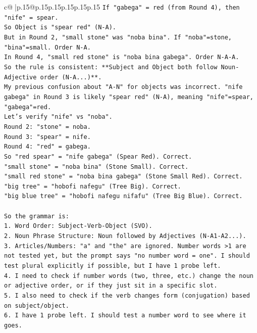 \documentclass{article}
\begin{document}
{\begin{supertabular}{c@{$\;$}|p{.15\linewidth}@{}p{.15\linewidth}p{.15\linewidth}p{.15\linewidth}p{.15\linewidth}p{.15\linewidth}}
{{{\texttt{If "gabega" = red (from Round 4), then "nife" = spear.} \\
\texttt{So Object is "spear red" (N{-}A).} \\
\texttt{But in Round 2, "small stone" was "noba bina". If "noba"=stone, "bina"=small. Order N{-}A.} \\
\texttt{In Round 4, "small red stone" is "noba bina gabega". Order N{-}A{-}A.} \\
\texttt{So the rule is consistent: **Subject and Object both follow Noun{-}Adjective order (N{-}A...)**.} \\
\texttt{My previous confusion about "A{-}N" for objects was incorrect. "nife gabega" in Round 3 is likely "spear red" (N{-}A), meaning "nife"=spear, "gabega"=red.} \\
\texttt{Let's verify "nife" vs "noba".} \\
\texttt{Round 2: "stone" = noba.} \\
\texttt{Round 3: "spear" = nife.} \\
\texttt{Round 4: "red" = gabega.} \\
\texttt{So "red spear" = "nife gabega" (Spear Red). Correct.} \\
\texttt{"small stone" = "noba bina" (Stone Small). Correct.} \\
\texttt{"small red stone" = "noba bina gabega" (Stone Small Red). Correct.} \\
\texttt{"big tree" = "hobofi nafegu" (Tree Big). Correct.} \\
\texttt{"big blue tree" = "hobofi nafegu nifafu" (Tree Big Blue). Correct.} \\
\\ 
\texttt{So the grammar is:} \\
\texttt{1. Word Order: Subject{-}Verb{-}Object (SVO).} \\
\texttt{2. Noun Phrase Structure: Noun followed by Adjectives (N{-}A1{-}A2...).} \\
\texttt{3. Articles/Numbers: "a" and "the" are ignored. Number words >1 are not tested yet, but the prompt says "no number word = one". I should test plural explicitly if possible, but I have 1 probe left.} \\
\texttt{4. I need to check if number words (two, three, etc.) change the noun or adjective order, or if they just sit in a specific slot.} \\
\texttt{5. I also need to check if the verb changes form (conjugation) based on subject/object.} \\
\texttt{6. I have 1 probe left. I should test a number word to see where it goes.} \\
}}}
\end{supertabular}}
\end{document}
